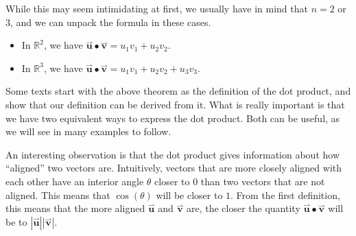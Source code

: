 \documentclass{ximera}
\begin{document}
While this may seem intimidating at first, we usually have in mind that $n=2$ or $3$, and we can unpack the formula in these cases.  

\begin{itemize}
\item In $\mathbb{R}^2$, we have $\overset{\boldsymbol{\rightharpoonup}}{\mathbf{u}} \bullet \overset{\boldsymbol{\rightharpoonup}}{\mathbf{v}} = u_1v_1+u_2v_2$.
\item In $\mathbb{R}^3$, we have $\overset{\boldsymbol{\rightharpoonup}}{\mathbf{u}} \bullet\overset{\boldsymbol{\rightharpoonup}}{\mathbf{v}} = u_1v_1+u_2v_2+u_3v_3$.
\end{itemize}

Some texts start with the above theorem as the definition of the dot product, and show that our definition can be derived from it.  What is really important is that we have two equivalent ways to express the dot product.  Both can be useful, as we will see in many examples to follow.

\begin{remark}
An interesting observation is that the dot product gives information about how ``aligned'' two vectors are.  Intuitively, vectors that are more closely aligned with each other have an interior angle $\theta$ closer to $0$ than two vectors that are not aligned.  This means that $\cos(\theta)$ will be closer to $1$. From the first definition, this means that the more aligned $\overset{\boldsymbol{\rightharpoonup}}{\mathbf{u}}$ and $\overset{\boldsymbol{\rightharpoonup}}{\mathbf{v}}$ are, the closer the quantity $\overset{\boldsymbol{\rightharpoonup}}{\mathbf{u}} \bullet \overset{\boldsymbol{\rightharpoonup}}{\mathbf{v}}$ will be to $|\overset{\boldsymbol{\rightharpoonup}}{\mathbf{u}}||\overset{\boldsymbol{\rightharpoonup}}{\mathbf{v}}|$.
\end{remark}
\end{document}
